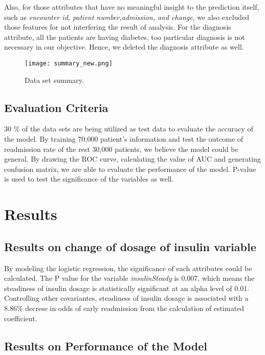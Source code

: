 \documentclass[twoside,11pt]{article}
\begin{document}
Also, for those attributes that have no meaningful insight to the prediction itself, such as \textit{encounter id, patient number,admission, and change}, we also excluded those features for not interfering the result of analysis. For the diagnosis attribute, all the patients are having diabetes, too particular diagnosis is not necessary in our objective. Hence, we deleted the diagnosis attribute as well.  

\begin{figure}[htbp!]
  \centering 
  \texttt{[image: summary\_new.png]} 
  \caption{Data set summary.}
  \label{fig:example} 
\end{figure} 

\subsection{Evaluation Criteria}
30 \% of the data sets are being utilized as test data to evaluate the accuracy of the model. By training 70,000 patient's information and test the outcome of readmission rate of the rest 30,000 patients, we believe the model could be general. By drawing the ROC curve, calculating the value of AUC and generating confusion matrix, we are able to evaluate the performance of the model. P-value is used to test the significance of the variables as well.  

\section{Results} \label{results}


\subsection{Results on change of dosage of insulin variable} 

By modeling the logistic regression, the significance of each attributes could be calculated. The P value for the variable \emph{insulinSteady} is 0.007, which means the steadiness of insulin dosage is statistically significant at an alpha level of 0.01. Controlling other covariantes, steadiness of insulin dosage is associated with a 8.86\% decrese in odds of early readmission from the calculation of estimated coefficient.   

\subsection{Results on Performance of the Model}
\end{document}
